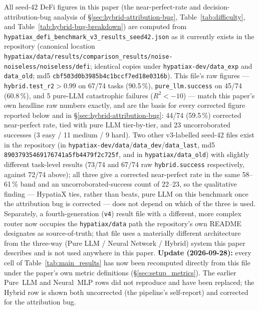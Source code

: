\documentclass[twoside,11pt]{article}
\newcommand{\Rsq}{R^{2}}
\begin{document}
\begin{center}
{{All seed-42 DeFi figures in this paper (the near-perfect-rate and
decision-attribution-bug analysis of \S\ref{sec:hybrid-attribution-bug},
Table~\ref{tab:difficulty}, and Table~\ref{tab:hybrid-bug-breakdown}) are
computed from \texttt{hypatiax\_defi\_benchmark\_v3\_results\_seed42.json}
as it currently exists in the repository (canonical location
\texttt{hypatiax/data/results/comparison\_results/noise-noiseless/noiseless/defi};
identical copies under \texttt{hypatiax-dev/data\_exp} and \texttt{data\_old};
md5 \texttt{cbf503d0b3985b4c1bccf7ed18e0316b}). This file's raw figures
--- \texttt{hybrid.test\_r2}$>0.99$ on 67/74 tasks (90.5\,\%),
\texttt{pure\_llm.success} on 45/74 (60.8\,\%), and 5 pure-LLM
catastrophic failures ($\Rsq<-10$) --- match this paper's own headline
raw numbers exactly, and are the basis for every corrected figure
reported below and in \S\ref{sec:hybrid-attribution-bug}: 44/74 (59.5\,\%)
corrected near-perfect rate, tied with pure LLM tier-by-tier, and 23
uncorroborated successes (3 easy / 11 medium / 9 hard). Two other v3-labelled seed-42 files exist in the
repository (in \texttt{hypatiax-dev/data}/\texttt{data\_dev}/\texttt{data\_last},
md5 \texttt{89037935469176741a5fb4479f2c725f}, and in
\texttt{hypatiax/data\_old}) with slightly different task-level results
(73/74 and 67/74 raw \texttt{hybrid.success} respectively, against 72/74
above); all three give a corrected near-perfect rate in the same
58--61\,\% band and an uncorroborated-success count of 22--23, so the
qualitative finding --- HypatiaX ties, rather than beats, pure LLM on
this benchmark once the attribution bug is corrected --- does not depend
on which of the three is used. Separately, a fourth-generation
(\texttt{v4}) result file with a different, more complex router now
occupies the \texttt{hypatiax/data} path the repository's own README
designates as source-of-truth; that file uses a materially different
architecture from the three-way (Pure LLM / Neural Network / Hybrid)
system this paper describes and is not used anywhere in this paper. \textbf{Update (2026-09-28):} every cell of
Table~\ref{tab:main_results} has now been recomputed directly from this
file under the paper's own metric definitions (\S\ref{sec:setup_metrics}).
The earlier Pure~LLM and Neural~MLP rows did not reproduce and have been
replaced; the Hybrid row is shown both uncorrected (the pipeline's
self-report) and corrected for the attribution bug.}}
\end{center}
\vspace{0.5em}
\end{document}
